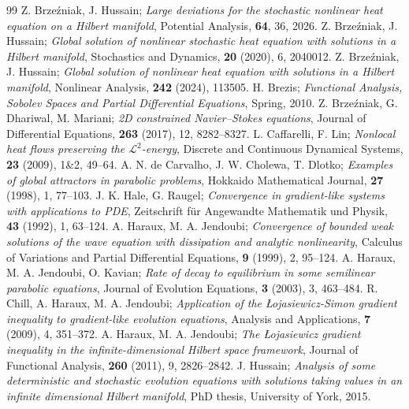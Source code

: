\documentclass[10pt,a4paper]{amsart}
\numberwithin{equation}{section}
\begin{document}
\begin{thebibliography}{99}
 Z. Brze\'zniak, J. Hussain; \emph{Large deviations for the stochastic nonlinear heat equation on a Hilbert manifold}, Potential Analysis, \textbf{64}, 36, 2026.
 Z. Brze\'zniak, J. Hussain; \emph{Global solution of nonlinear stochastic heat equation with solutions in a Hilbert manifold}, Stochastics and Dynamics, \textbf{20} (2020), 6, 2040012.
 Z. Brze\'zniak, J. Hussain; \emph{Global solution of nonlinear heat equation with solutions in a Hilbert manifold}, Nonlinear Analysis, \textbf{242}  (2024), 113505.
 H. Brezis; \emph{Functional Analysis, Sobolev Spaces and Partial Differential Equations}, Spring, 2010.
 Z. Brze\'{z}niak, G. Dhariwal, M. Mariani; \emph{2D constrained Navier--Stokes equations}, Journal of Differential Equations, \textbf{263}  (2017), 12, 8282--8327.
 L. Caffarelli, F. Lin; \emph{Nonlocal heat flows preserving the $\mathcal{L}^{2}$-energy}, Discrete and Continuous Dynamical Systems, \textbf{23} (2009), 1\&2, 49--64.
 A. N. de Carvalho, J. W. Cholewa, T. Dlotko; \emph{Examples of global attractors in parabolic problems}, Hokkaido Mathematical Journal, \textbf{27}  (1998), 1, 77--103.
 J. K. Hale, G. Raugel; \emph{Convergence in gradient-like systems with applications to PDE}, Zeitschrift f\"{u}r Angewandte Mathematik und Physik, \textbf{43} (1992), 1, 63--124.
 A. Haraux, M. A. Jendoubi; \emph{Convergence of bounded weak solutions of the wave equation with dissipation and analytic nonlinearity}, Calculus of Variations and Partial Differential Equations, \textbf{9} (1999), 2, 95--124.
 A. Haraux, M. A. Jendoubi, O. Kavian; \emph{Rate of decay to equilibrium in some semilinear parabolic equations}, Journal of Evolution Equations, \textbf{3} (2003), 3, 463--484.
 R. Chill, A. Haraux, M. A. Jendoubi; \emph{Application of the \L{o}jasiewicz-Simon gradient inequality to gradient-like evolution equations}, Analysis and Applications, \textbf{7} (2009), 4, 351--372.
 A. Haraux, M. A. Jendoubi; \emph{The \L{o}jasiewicz gradient inequality in the infinite-dimensional Hilbert space framework}, Journal of Functional Analysis, \textbf{260} (2011), 9, 2826--2842.
 J. Hussain; \emph{Analysis of some deterministic and stochastic evolution equations with solutions taking values in an infinite dimensional Hilbert manifold}, PhD thesis, University of York, 2015.

\end{thebibliography}
\end{document}
